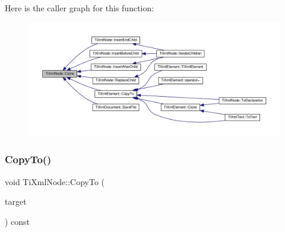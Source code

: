 Here is the caller graph for this function\+:\nopagebreak
\begin{figure}[H]
\begin{center}
\leavevmode
\includegraphics[width=350pt]{class_ti_xml_node_a4508cc3a2d7a98e96a54cc09c37a78a4_icgraph}
\end{center}
\end{figure}
\mbox{\label{class_ti_xml_node_aaadd5bb9c94f84c4472b649b95de4a0b}} 
\subsubsection{\texorpdfstring{Copy\+To()}{CopyTo()}}
{\footnotesize\ttfamily void Ti\+Xml\+Node\+::\+Copy\+To (\begin{DoxyParamCaption}\item[{\hyperlink{class_ti_xml_node}{Ti\+Xml\+Node} $\ast$}]{target }\end{DoxyParamCaption}) const\hspace{0.3cm}{\ttfamily [protected]}}

